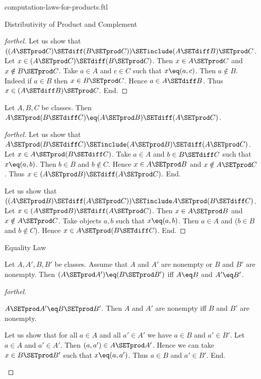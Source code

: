 \documentclass{naproche-library}
\begin{document}
\begin{smodule}[title=Computation Laws for Cartesian Products]{computation-laws-for-products.ftl}
\begin{sfragment}{Distributivity of Product and Complement}
\begin{proof}[forthel]
    Let us show that $((A \SETprod C) \SETdiff (B \SETprod C)) \SETinclude (A \SETdiff B) \SETprod C$. %
      Let $x \in (A \SETprod C) \SETdiff (B \SETprod C)$.
      Then $x \in A \SETprod C$ and $x \notin B \SETprod C$.
      Take $a \in A$ and $c \in C$ such that $x \eq (a, c)$.
      Then $a \notin B$.
      Indeed if $a \in B$ then $x \in B \SETprod C$.
      Hence $a \in A \SETdiff B$.
      Thus $x \in (A \SETdiff B) \SETprod C$.
    End.
  \end{proof}

  \begin{proposition}[forthel,id=FOUNDATIONS_05_3195639422779392]
    Let $A, B, C$ be classes.
    Then $A \SETprod (B \SETdiff C) \eq (A \SETprod B) \SETdiff (A \SETprod C)$.
  \end{proposition}
  \begin{proof}[forthel]
    Let us show that $A \SETprod (B \SETdiff C) \SETinclude (A \SETprod B) \SETdiff (A \SETprod C)$.
      Let $x \in A \SETprod (B \SETdiff C)$.
      Take $a \in A$ and $b \in B \SETdiff C$ such that $x \eq (a, b)$.
      Then $b \in B$ and $b \notin C$.
      Hence $x \in A \SETprod B$ and $x \notin A \SETprod C$.
      Thus $x \in (A \SETprod B) \SETdiff (A \SETprod C)$.
    End.

    Let us show that $((A \SETprod B) \SETdiff (A \SETprod C)) \SETinclude A \SETprod (B \SETdiff C)$. %
      Let $x \in (A \SETprod B) \SETdiff (A \SETprod C)$.
      Then $x \in A \SETprod B$ and $x \notin A \SETprod C$.
      Take objects $a, b$ such that $x \eq (a, b)$.
      Then $a \in A$ and ($b \in B$ and $b \notin C$).
      Hence $x \in A \SETprod (B \SETdiff C)$.
    End.
  \end{proof}
\end{sfragment}

\begin{sfragment}{Equality Law}
  \begin{proposition}[forthel,id=FOUNDATIONS_05_2677218429894656]
    Let $A, A', B, B'$ be classes.
    Assume that $A$ and $A'$ are nonempty or $B$ and $B'$ are nonempty.
    Then $(A \SETprod A') \eq (B \SETprod B')$ iff $A \eq B$ and $A' \eq B'$.
  \end{proposition}
  \begin{proof}[forthel]
    \begin{case}{$A \SETprod A' \eq B \SETprod B'$.}
      Then $A$ and $A'$ are nonempty iff $B$ and $B'$ are nonempty.

      Let us show that for all $a \in A$ and all $a' \in A'$ we have $a \in B$ and $a' \in B'$.
        Let $a \in A$ and $a' \in A'$.
        Then $(a, a') \in A \SETprod A'$.
        Hence we can take $x \in B \SETprod B'$ such that $x \eq (a, a')$.
        Thus $a \in B$ and $a' \in B'$.
      End.


\end{case}
\end{proof}
\end{sfragment}
\end{smodule}
\end{document}
